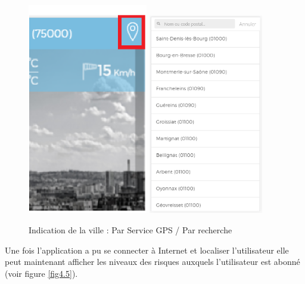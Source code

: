 \begin{figure}[!h]
	\begin{center}
		\includegraphics[width=5.25cm]{figures/gps}
		\includegraphics[width=5cm]{figures/choix_ville}
	\end{center}
	\caption{Indication de la ville : Par Service GPS / Par recherche}
	\label{fig4.4}
\end{figure}

Une fois l'application a pu se connecter à Internet et localiser l'utilisateur elle peut maintenant afficher les niveaux des risques auxquels l'utilisateur est abonné (voir figure \ref{fig4.5}).

